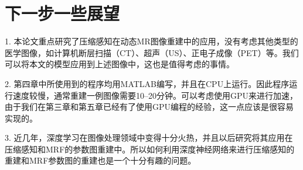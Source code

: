 \section{下一步一些展望}
1. 本论文重点研究了压缩感知在动态MR图像重建中的应用，没有考虑其他类型的医学图像，如计算机断层扫描（CT）、超声（US）、正电子成像（PET）等。我们可以将本文的模型应用到上述图像中，这也是值得考虑的事情。

2. 第四章中所使用到的程序均用MATLAB编写，并且在CPU上运行。因此程序运行速度较慢，通常重建一例图像需要10--20分钟。可以考虑使用GPU来进行加速，由于我们在第三章和第五章已经有了使用GPU编程的经验，这一点应该是很容易实现的。

3. 近几年，深度学习在图像处理领域中变得十分火热，并且以后研究将其应用在压缩感知和MRF的参数图重建中。所以如何利用深度神经网络来进行压缩感知的重建和MRF参数图的重建也是一个十分有趣的问题。
